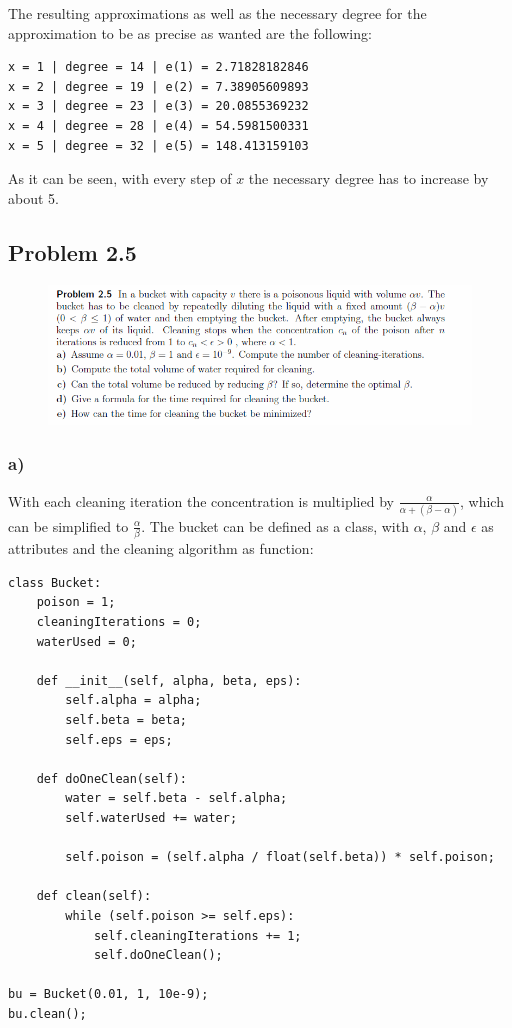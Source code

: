 The resulting approximations as well as the necessary degree for the approximation to be as precise as wanted are the following:

\begin{lstlisting}[caption=Result of 2.4 c), keywordstyle=\color{black}]
x = 1 | degree = 14 | e(1) = 2.71828182846
x = 2 | degree = 19 | e(2) = 7.38905609893
x = 3 | degree = 23 | e(3) = 20.0855369232
x = 4 | degree = 28 | e(4) = 54.5981500331
x = 5 | degree = 32 | e(5) = 148.413159103
\end{lstlisting}

As it can be seen, with every step of $x$ the necessary degree has to increase by about 5.


\subsection{Problem 2.5}

\begin{figure}[!ht]
\includegraphics[width=1\textwidth]{chapters/images/desc-2-5}
\end{figure}


\subsubsection{a)}

With each cleaning iteration the concentration is multiplied by $\frac{\alpha}{\alpha + (\beta - \alpha)}$, which can be simplified to $\frac{\alpha}{\beta}$. The bucket can be defined as a class, with $\alpha$, $\beta$ and $\epsilon$ as attributes and the cleaning algorithm as function:

\begin{lstlisting}[caption=Problem 2.5 a)]
class Bucket:
	poison = 1;
	cleaningIterations = 0;
	waterUsed = 0;
	
	def __init__(self, alpha, beta, eps):
		self.alpha = alpha;
		self.beta = beta;
		self.eps = eps;
	
	def doOneClean(self):
		water = self.beta - self.alpha;
		self.waterUsed += water;
		
		self.poison = (self.alpha / float(self.beta)) * self.poison;
	
	def clean(self):
		while (self.poison >= self.eps):
			self.cleaningIterations += 1;
			self.doOneClean();

bu = Bucket(0.01, 1, 10e-9);
bu.clean();
\end{lstlisting}

